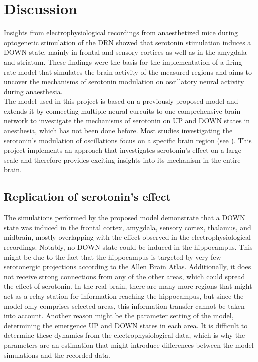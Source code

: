 
\chapter{Discussion}\label{cha:chapter4}
\noindent
\indent Insights from electrophysiological recordings from anaesthetized mice during optogenetic stimulation of the DRN showed that serotonin stimulation induces a DOWN state, mainly in frontal and sensory cortices as well as in the amygdala and striatum. These findings were the basis for the implementation of a firing rate model that simulates the brain activity of the measured regions and aims to uncover the mechanisms of serotonin modulation on oscillatory neural activity during anaesthesia. 
\\
\indent The model used in this project is based on a previously proposed model \cite{jercogUPDOWNCorticalDynamics2017} and extends it by connecting multiple neural curcuits to one comprehensive brain network to investigate the mechanisms of serotonin on UP and DOWN states in anesthesia, which has not been done before. Most studies investigating the serotonin's modulation of oscillations focus on a specific brain region (see \cite{puigSerotoninModulatesFastSpiking2010, puigSerotoninModulationPrefrontoHippocampal2015}). This project implements an approach that investigates serotonin's effect on a large scale and therefore provides exciting insights into its mechanism in the entire brain. 

\section{Replication of serotonin's effect}
\noindent
\indent The simulations performed by the proposed model demonstrate that a DOWN state was induced in the frontal cortex, amygdala, sensory cortex, thalamus, and midbrain, mostly overlapping with the effect observed in the electrophysiological recordings. Notably, no DOWN state could be induced in the hippocampus. This might be due to the fact that the hippocampus is targeted by very few serotonergic projections according to the Allen Brain Atlas. Additionally, it does not receive strong connections from any of the other areas, which could spread the effect of serotonin. In the real brain, there are many more regions that might act as a relay station for information reaching the hippocampus, but since the model only comprises selected areas, this information transfer cannot be taken into account. Another reason might be the parameter setting of the model, determining the emergence UP and DOWN states in each area. It is difficult to determine these dynamics from the electrophysiological data, which is why the parameters are an estimation that might introduce differences between the model simulations and the recorded data. 

